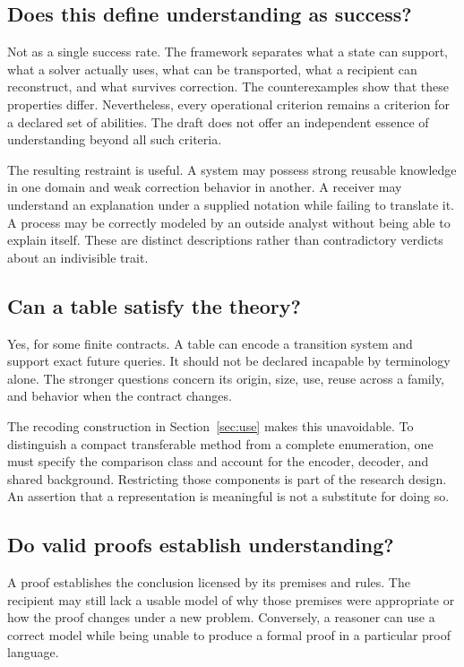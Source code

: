 \documentclass[11pt,letterpaper]{article}
\theoremstyle{plain}
\theoremstyle{definition}
\begin{document}
\subsection{Does this define understanding as success?}
Not as a single success rate. The framework separates what a state can support, what a solver actually uses, what can be transported, what a recipient can reconstruct, and what survives correction. The counterexamples show that these properties differ. Nevertheless, every operational criterion remains a criterion for a declared set of abilities. The draft does not offer an independent essence of understanding beyond all such criteria.

The resulting restraint is useful. A system may possess strong reusable knowledge in one domain and weak correction behavior in another. A receiver may understand an explanation under a supplied notation while failing to translate it. A process may be correctly modeled by an outside analyst without being able to explain itself. These are distinct descriptions rather than contradictory verdicts about an indivisible trait.

\subsection{Can a table satisfy the theory?}
Yes, for some finite contracts. A table can encode a transition system and support exact future queries. It should not be declared incapable by terminology alone. The stronger questions concern its origin, size, use, reuse across a family, and behavior when the contract changes.

The recoding construction in Section~\ref{sec:use} makes this unavoidable. To distinguish a compact transferable method from a complete enumeration, one must specify the comparison class and account for the encoder, decoder, and shared background. Restricting those components is part of the research design. An assertion that a representation is meaningful is not a substitute for doing so.

\subsection{Do valid proofs establish understanding?}
A proof establishes the conclusion licensed by its premises and rules. The recipient may still lack a usable model of why those premises were appropriate or how the proof changes under a new problem. Conversely, a reasoner can use a correct model while being unable to produce a formal proof in a particular proof language.
\end{document}
